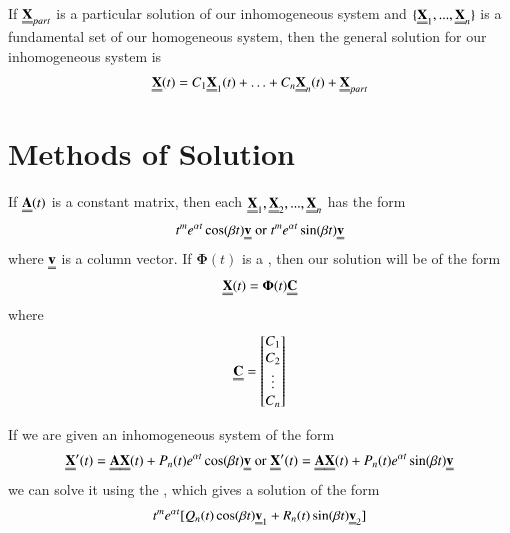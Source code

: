 \documentclass[12pt, a4paper, oneside, openright, titlepage]{book}
\begin{document}
\begin{thm}
        If $\Emph{X}_{part}$ is a particular solution of our inhomogeneous system and $\{\Emph{X}_1,...,\Emph{X}_n\}$ is a fundamental set of our homogeneous system, then the general solution for our inhomogeneous system is \begin{equation}
                \Emph{X}(t) = C_1\Emph{X}_1(t) + \hdots +  C_n\Emph{X}_n(t) + \Emph{X}_{part}
        \end{equation}
\end{thm}


\section{Methods of Solution}


\begin{defn}
        If $\Emph{A}(t)$ is a constant matrix, then each $\Emph{X}_1,\Emph{X}_2,...,\Emph{X}_n$ has the form \begin{equation}
                t^me^{\alpha t}\cos(\beta t)\Emph{v}\;\text{or}\;t^me^{\alpha t}\sin(\beta t)\Emph{v}
        \end{equation}
        where $\Emph{v}$ is a column vector. If $\boldsymbol{\Phi}(t)$ is a , then our solution will be of the form \begin{equation}
                \Emph{X}(t) = \boldsymbol{\Phi}(t)\Emph{C}
        \end{equation}
        where \begin{equation}
                \Emph{C} = \begin{bmatrix} C_1 \\ C_2 \\ \vdots \\ C_n \end{bmatrix}
        \end{equation}
\end{defn}




\begin{defn}
        If we are given an inhomogeneous system of the form \begin{equation}
                \Emph{X}'(t) = \Emph{A}\Emph{X}(t) + P_n(t)e^{\alpha t}\cos(\beta t)\Emph{v}\;\text{or}\;\Emph{X}'(t) = \Emph{A}\Emph{X}(t) + P_n(t)e^{\alpha t}\sin(\beta t)\Emph{v}
        \end{equation}
        we can solve it using the , which gives a solution of the form \begin{equation}
                t^me^{\alpha t}[Q_n(t)\cos(\beta t)\Emph{v}_1 + R_n(t)\sin(\beta t)\Emph{v}_2]
        \end{equation}
\end{defn}
\end{document}
